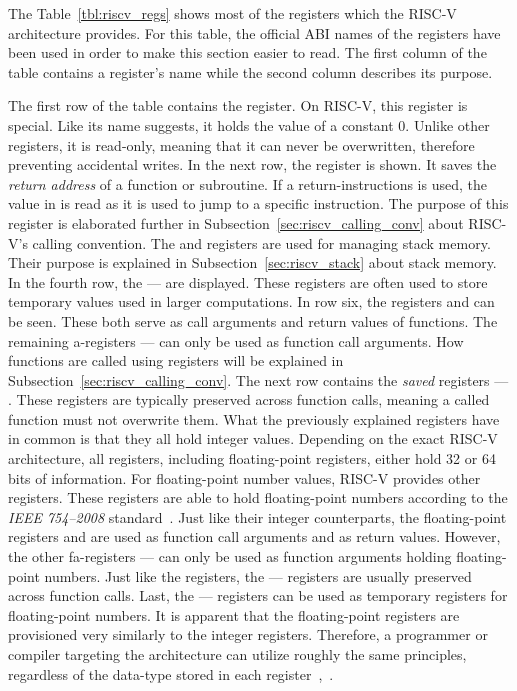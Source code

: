 The Table~\ref{tbl:riscv_regs} shows most of the registers which the RISC-V architecture provides.
For this table, the official ABI names of the registers have been used in order to make this section easier to read.
The first column of the table contains a register's name while the second column describes its purpose.

The first row of the table contains the  register.
On RISC-V, this register is special.
Like its name suggests, it holds the value of a constant 0.
Unlike other registers, it is read-only, meaning that it can never be overwritten, therefore preventing accidental writes.
In the next row, the  register is shown.
It saves the \emph{return address} of a function or subroutine.
If a return-instructions is used, the value in  is read as it is used to jump to a specific instruction.
The purpose of this register is elaborated further in Subsection~\ref{sec:riscv_calling_conv} about RISC-V's calling convention.
The  and  registers are used for managing stack memory.
Their purpose is explained in Subsection~\ref{sec:riscv_stack} about stack memory.
In the fourth row, the  —  are displayed.
These registers are often used to store temporary values used in larger computations.
In row six, the registers  and  can be seen.
These both serve as call arguments and return values of functions.
The remaining a-registers  —  can only be used as function call arguments.
How functions are called using registers will be explained in Subsection~\ref{sec:riscv_calling_conv}.
The next row contains the \emph{saved} registers  — .
These registers are typically preserved across function calls, meaning a called function must not overwrite them.
What the previously explained registers have in common is that they all hold integer values.
Depending on the exact RISC-V architecture, all registers, including floating-point registers, either hold 32 or 64 bits of information.
For floating-point number values, RISC-V provides other registers.
These registers are able to hold floating-point numbers according to the \emph{IEEE 754--2008} standard~\cite[Chapter~11]{Waterman2019}.
Just like their integer counterparts, the floating-point registers  and  are used as function call arguments and as return values.
However, the other fa-registers  —  can only be used as function arguments holding floating-point numbers.
Just like the  registers, the  —  registers are usually preserved across function calls.
Last, the  —  registers can be used as temporary registers for floating-point numbers.
It is apparent that the floating-point registers are provisioned very similarly to the integer registers.
Therefore, a programmer or compiler targeting the architecture can utilize roughly the same principles,
regardless of the data-type stored in each register~\cite[pp.~18f,p.~34]{Patterson2017},~\cite[p.~155]{Waterman2019}.

